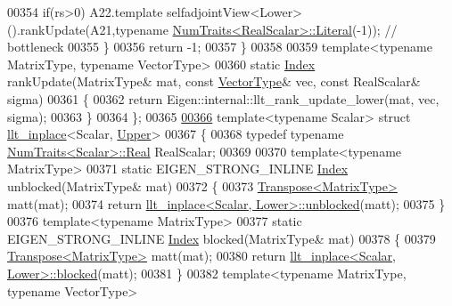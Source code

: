 \begin{DoxyCode}
00354       \textcolor{keywordflow}{if}(rs>0) A22.template selfadjointView<Lower>().rankUpdate(A21,\textcolor{keyword}{typename} 
      \hyperlink{group___core___module_struct_eigen_1_1_num_traits}{NumTraits<RealScalar>::Literal}(-1)); \textcolor{comment}{// bottleneck}
00355     \}
00356     \textcolor{keywordflow}{return} -1;
00357   \}
00358 
00359   \textcolor{keyword}{template}<\textcolor{keyword}{typename} MatrixType, \textcolor{keyword}{typename} VectorType>
00360   \textcolor{keyword}{static} \hyperlink{namespace_eigen_a62e77e0933482dafde8fe197d9a2cfde}{Index} rankUpdate(MatrixType& mat, \textcolor{keyword}{const} \hyperlink{struct_vector_type}{VectorType}& vec, \textcolor{keyword}{const} RealScalar& sigma)
00361   \{
00362     \textcolor{keywordflow}{return} Eigen::internal::llt\_rank\_update\_lower(mat, vec, sigma);
00363   \}
00364 \};
00365 
\hyperlink{struct_eigen_1_1internal_1_1llt__inplace_3_01_scalar_00_01_upper_01_4}{00366} \textcolor{keyword}{template}<\textcolor{keyword}{typename} Scalar> \textcolor{keyword}{struct }\hyperlink{struct_eigen_1_1internal_1_1llt__inplace}{llt\_inplace}<Scalar, \hyperlink{group__enums_gga39e3366ff5554d731e7dc8bb642f83cda6bcb58be3b8b8ec84859ce0c5ac0aaec}{Upper}>
00367 \{
00368   \textcolor{keyword}{typedef} \textcolor{keyword}{typename} \hyperlink{group___core___module_struct_eigen_1_1_num_traits}{NumTraits<Scalar>::Real} RealScalar;
00369 
00370   \textcolor{keyword}{template}<\textcolor{keyword}{typename} MatrixType>
00371   \textcolor{keyword}{static} EIGEN\_STRONG\_INLINE \hyperlink{namespace_eigen_a62e77e0933482dafde8fe197d9a2cfde}{Index} unblocked(MatrixType& mat)
00372   \{
00373     \hyperlink{group___core___module_class_eigen_1_1_transpose}{Transpose<MatrixType>} matt(mat);
00374     \textcolor{keywordflow}{return} \hyperlink{struct_eigen_1_1internal_1_1llt__inplace}{llt\_inplace<Scalar, Lower>::unblocked}(matt);
00375   \}
00376   \textcolor{keyword}{template}<\textcolor{keyword}{typename} MatrixType>
00377   \textcolor{keyword}{static} EIGEN\_STRONG\_INLINE \hyperlink{namespace_eigen_a62e77e0933482dafde8fe197d9a2cfde}{Index} blocked(MatrixType& mat)
00378   \{
00379     \hyperlink{group___core___module_class_eigen_1_1_transpose}{Transpose<MatrixType>} matt(mat);
00380     \textcolor{keywordflow}{return} \hyperlink{struct_eigen_1_1internal_1_1llt__inplace}{llt\_inplace<Scalar, Lower>::blocked}(matt);
00381   \}
00382   \textcolor{keyword}{template}<\textcolor{keyword}{typename} MatrixType, \textcolor{keyword}{typename} VectorType>

\end{DoxyCode}
